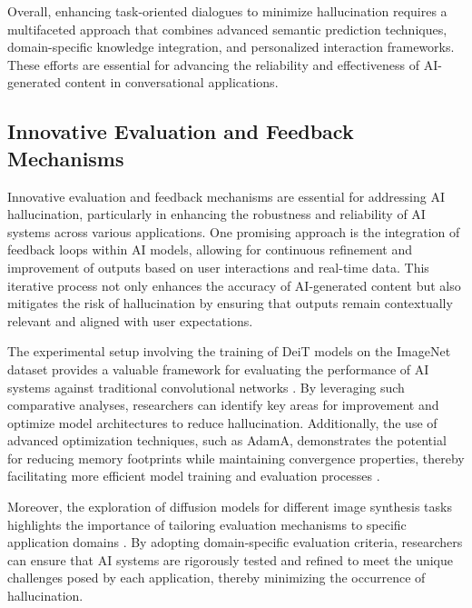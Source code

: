 Overall, enhancing task-oriented dialogues to minimize hallucination requires a multifaceted approach that combines advanced semantic prediction techniques, domain-specific knowledge integration, and personalized interaction frameworks. These efforts are essential for advancing the reliability and effectiveness of AI-generated content in conversational applications.



\subsection{Innovative Evaluation and Feedback Mechanisms} \label{subsec:Innovative Evaluation and Feedback Mechanisms}

Innovative evaluation and feedback mechanisms are essential for addressing AI hallucination, particularly in enhancing the robustness and reliability of AI systems across various applications. One promising approach is the integration of feedback loops within AI models, allowing for continuous refinement and improvement of outputs based on user interactions and real-time data. This iterative process not only enhances the accuracy of AI-generated content but also mitigates the risk of hallucination by ensuring that outputs remain contextually relevant and aligned with user expectations.



The experimental setup involving the training of DeiT models on the ImageNet dataset provides a valuable framework for evaluating the performance of AI systems against traditional convolutional networks \cite{timagetran3}. By leveraging such comparative analyses, researchers can identify key areas for improvement and optimize model architectures to reduce hallucination. Additionally, the use of advanced optimization techniques, such as AdamA, demonstrates the potential for reducing memory footprints while maintaining convergence properties, thereby facilitating more efficient model training and evaluation processes \cite{zhang2023adamaccumulationreducememory}.



Moreover, the exploration of diffusion models for different image synthesis tasks highlights the importance of tailoring evaluation mechanisms to specific application domains \cite{rombach2022high}. By adopting domain-specific evaluation criteria, researchers can ensure that AI systems are rigorously tested and refined to meet the unique challenges posed by each application, thereby minimizing the occurrence of hallucination.



